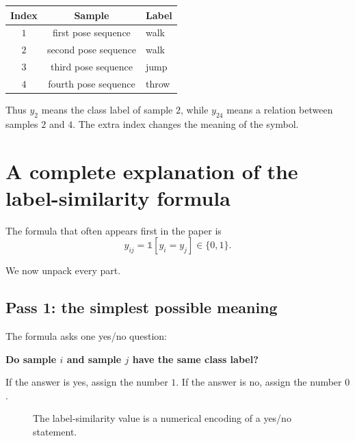 \documentclass[11pt,oneside,openany]{book}
\theoremstyle{myplain}
\theoremstyle{definition}
\newcommand{\ind}{\mathds{1}}
\begin{document}
\begin{center}
\begin{tabular}{ccl}
\toprule
Index & Sample & Label \\
\midrule
$1$ & first pose sequence & walk \\
$2$ & second pose sequence & walk \\
$3$ & third pose sequence & jump \\
$4$ & fourth pose sequence & throw \\
\bottomrule
\end{tabular}
\end{center}

Thus $y_2$ means the class label of sample $2$, while $y_{24}$ means a relation between samples $2$ and $4$. The extra index changes the meaning of the symbol.

\section{A complete explanation of the label-similarity formula}
\label{sec:indicator-primer}

The formula that often appears first in the paper is
\begin{equation}
  y_{ij}=\ind[y_i=y_j]\in\{0,1\}.
  \label{eq:indicator-primer}
\end{equation}

We now unpack every part.

\subsection{Pass 1: the simplest possible meaning}

The formula asks one yes/no question:

\begin{center}
\Large\bfseries
Do sample $i$ and sample $j$ have the same class label?
\end{center}

If the answer is yes, assign the number $1$. If the answer is no, assign the number $0$.

\begin{figure}[H]
\centering
{}
\caption{The label-similarity value is a numerical encoding of a yes/no statement.}
\end{figure}
\end{document}
